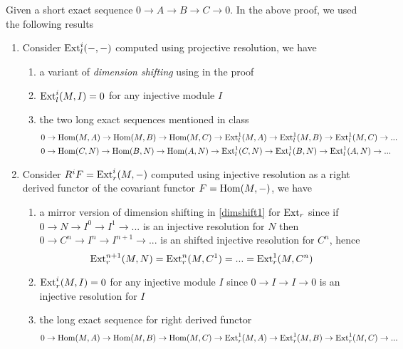 \begin{remark}
	\label{dimshift2}
	Given a short exact sequence $0 \to A \to B \to C \to 0$. In the above proof, we used the following results
	\begin{enumerate}
		\item Consider $\operatorname{Ext}_l^i(-, -)$ computed using projective resolution, we have
		\begin{enumerate}
			\item a variant of \textit{dimension shifting} using in the proof
			\item $\operatorname{Ext}_l^i(M, I) = 0$ for any injective module $I$
			\item the two long exact sequences mentioned in class
			\begin{align*}
				&0 \to \operatorname{Hom}(M, A) \to \operatorname{Hom}(M, B) \to \operatorname{Hom}(M, C) \to \operatorname{Ext}^1_l(M, A) \to \operatorname{Ext}^1_l(M, B) \to \operatorname{Ext}^1_l(M, C) \to ... \\
				&0 \to \operatorname{Hom}(C, N) \to \operatorname{Hom}(B, N) \to \operatorname{Hom}(A, N) \to \operatorname{Ext}^1_l(C, N) \to \operatorname{Ext}^1_l(B, N) \to \operatorname{Ext}^1_l(A, N) \to ...
			\end{align*}
		\end{enumerate}
		
		\item Consider $R^i F = \operatorname{Ext}_r^i(M, -)$ computed using injective resolution as a right derived functor of the covariant functor $F = \operatorname{Hom}(M, -)$, we have
		\begin{enumerate}
			\item a mirror version of dimension shifting in \ref{dimshift1} for $\operatorname{Ext}_r$ since if $0 \to N \to I^0 \to I^1 \to ...$ is an injective resolution for $N$ then $0 \to C^n \to I^n \to I^{n+1} \to ...$ is an shifted injective resolution for $C^n$, hence
			$$
				\operatorname{Ext}^{n+1}_r(M, N) = \operatorname{Ext}^n_r(M, C^1) = ... = \operatorname{Ext}^1_r(M, C^n)
			$$
			\item $\operatorname{Ext}_r^i(M, I) = 0$ for any injective module $I$ since $0 \to I \to I \to 0$ is an injective resolution for $I$
			\item the long exact sequence for right derived functor 
			$$
				0 \to \operatorname{Hom}(M, A) \to \operatorname{Hom}(M, B) \to \operatorname{Hom}(M, C) \to \operatorname{Ext}^1_r(M, A) \to \operatorname{Ext}^1_r(M, B) \to \operatorname{Ext}^1_r(M, C) \to  ...
			$$
		\end{enumerate}
	\end{enumerate}	
	
	
	
\end{remark}


